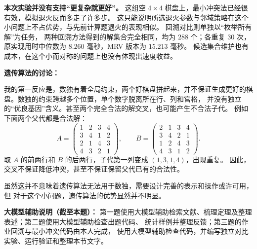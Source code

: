 \documentclass[utf8]{ctexart}
\theoremstyle{mystyle}
\begin{document}
\textbf{本次实验并没有支持“更复杂就更好”。}
这组空 $4\times4$ 棋盘上，最小冲突法已经很有效，模拟退火反而多走了许多步。
这只能说明所选退火参数与邻域策略在这个小问题上不占优势，与先前计算题退火的表现相似。
回溯对比则单独以“枚举所有解”为任务，
两种回溯方法得到的解集合完全相同，均为 $288$ 个；各重复 $30$ 次，
原实现用时中位数为 $8.260$ 毫秒，MRV 版本为 $15.213$ 毫秒。
候选集合维护也有成本，在这个小而对称的问题上也没有体现出速度收益。

\medskip
\noindent\textbf{遗传算法的讨论：}

我的第一反应是，数独有着全局约束，两个好棋盘拼起来，并不保证生成更好的棋盘。数独的约束跨越多个位置，单个数字脱离所在行、列和宫格，
并没有独立的“优良基因”含义。甚至两个完全合法的解交叉，也可能产生不合法子代。
例如下面两个父代都是合法解：
\[
 A=\begin{pmatrix}1&2&3&4\\3&4&1&2\\2&1&4&3\\4&3&2&1\end{pmatrix},
 \qquad
 B=\begin{pmatrix}2&1&3&4\\3&4&2&1\\1&2&4&3\\4&3&1&2\end{pmatrix}.
\]
取 $A$ 的前两行和 $B$ 的后两行，子代第一列变成 $(1,3,1,4)$，出现重复。
因此，交叉不保证降低冲突，甚至不保证保留父代已有的合法性。

虽然这并不意味着遗传算法无法用于数独，需要设计完善的表示和操作或许可用，但
对于这个小问题，遗传算法的优势显然并不明显。

\medskip
\noindent\textbf{大模型辅助说明（截至本题）：}
第一题使用大模型辅助检索文献、梳理定理及整理表述；第二题使用大模型辅助检查出题代码、
统计样例并整理反馈；第三题的作业回溯与最小冲突代码由本人完成，
使用大模型辅助检查代码，并编写独立对比实验、运行验证和整理本节文字。
\end{document}

